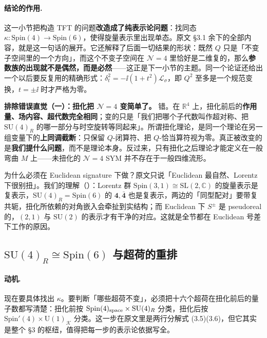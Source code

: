 \paragraph{结论的作用.}
这一小节把构造 TFT 的问题\textbf{改造成了纯表示论问题}：找同态 $\kappa:\mathrm{Spin}(4)\to\mathrm{Spin}(6)$，使得旋量表示里出现单态。原文 §3.1 余下的全部内容，就是这一句话的展开\pA{}。它还解释了后面一切结果的形状：既然 $Q$ 只是「不变子空间里的一个方向」，而这个不变子空间在 $\mathcal N=4$ 里恰好是二维复的，那么\textbf{参数族的出现就不是偶然，而是必然}——这正是下一小节的主题。同一个论证还给出一个以后要反复用的精确形式：$\delta_t^2=-\ii(1+t^2)\mathcal L_\sigma$，即 $Q^2$ 至多是一个规范变换，$t=\pm\ii$ 时才严格为零\pA{}。

\begin{warn}
\textbf{排除错误直觉（一）：扭化把 $\mathcal N=4$ 变简单了。} 错。在 $\mathbb R^4$ 上，扭化前后的\textbf{作用量、场内容、超代数完全相同}；变的只是「我们把哪个子代数叫作超对称、把 $\mathrm{SU}(4)_R$ 的哪一部分与时空旋转等同起来」。所谓扭化理论，是同一个理论在另一组变量下的\textbf{上同调截断}：只保留 $Q$-闭算符、把 $Q$-恰当算符视为零。真正被改变的是\textbf{我们提什么问题}，而不是理论本身。反过来，只有扭化之后理论才能定义在一般弯曲 $M$ 上——未扭化的 $\mathcal N=4$ SYM 并不存在于一般四维流形\pC。
\end{warn}

\begin{stuck}
为什么必须在 Euclidean signature 下做？原文只说「Euclidean 最自然、Lorentz 下很别扭」\pA{}。我们的理解（\pB）：Lorentz 群 $\mathrm{Spin}(3,1)\cong\mathrm{SL}(2,\mathbb C)$ 的旋量表示是复表示，$\mathrm{SU}(4)_R=\mathrm{Spin}(6)$ 的 $\mathbf 4,\bar{\mathbf 4}$ 也是复表示，两边的「同型配对」要带复共轭，扭化所依赖的对角嵌入会牵扯到实结构；而 Euclidean 下 $S^{\pm}$ 是 pseudoreal 的，$(2,1)$ 与 $\mathrm{SU}(2)$ 的表示才有干净的对应\pC。这就是全节都在 Euclidean 号差下工作的原因。
\end{stuck}

\subsection{$\mathrm{SU}(4)_R\cong\mathrm{Spin}(6)$ 与超荷的重排}

\paragraph{动机.}
现在要具体找出 $\kappa$。要判断「哪些超荷不变」，必须把十六个超荷在扭化前后的量子数都写清楚：扭化前按 $\mathrm{Spin}(4)_{\rm space}\times\mathrm{SU}(4)_R$ 分类，扭化后按 $\mathrm{Spin}'(4)\times\mathrm U(1)_{\mathcal K}$ 分类。这一步在原文里是两行分解式 (3.5)(3.6)，但它其实是整个 §3 的枢纽，值得把每一步的表示论依据写全。

